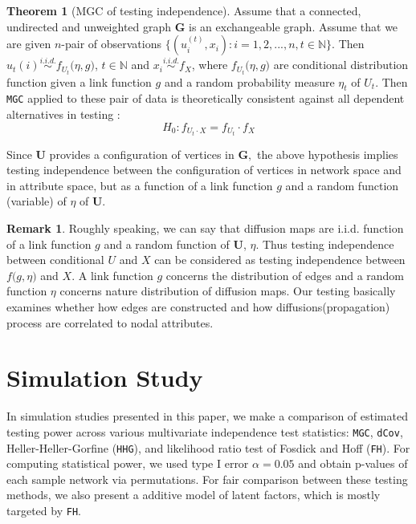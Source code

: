 \documentclass[12pt]{article}
\theoremstyle{definition}
\newtheorem{theorem}{Theorem}[section]
\newtheorem{remark}{Remark}
\begin{document}
\begin{theorem}[MGC of testing independence]
	\label{theorem1}
Assume that a connected, undirected and unweighted graph $\mathbf{G}$ is an exchangeable graph.  Assume that we are given $n$-pair of observations $\{ (u^{(t)}_{i}, x_{i}): i = 1,2,... , n  , t \in \mathbb{N} \}$. Then $u_{t}(i) \overset{i.i.d.}{\sim} f_{U_t} \big(  \eta, g \big)$, $t \in \mathbb{N}$ and $x_{i} \overset{i.i.d.}{\sim} f_{X}$, where $f_{U_t} \big( \eta, g \big)$ are conditional distribution function given a link function $g$ and a random probability measure $\eta_{t}$ of $U_t$. Then \texttt{MGC} applied to these pair of data is theoretically consistent against all dependent alternatives in testing :
$$H_{0} : f_{U_t \cdot X} = f_{U_t} \cdot f_{X}$$
\end{theorem}


Since $\boldsymbol{U}$ provides a configuration of vertices in $\boldsymbol{G},$ the above hypothesis implies testing independence between the configuration of vertices in network space and in attribute space, but as a function of a link function $g$ and a random function (variable) of $\eta$ of $\mathbf{U}$.


\begin{remark}
Roughly speaking, we can say that diffusion maps are i.i.d. function of a link function $g$ and a random function of $\mathbf{U}$, $\eta$. Thus testing independence between conditional $U$ and $X$ can be considered as testing independence between $f \big( g, \eta \big)$ and $X$. A link function $g$ concerns the distribution of edges and a random function $\eta$ concerns nature distribution of diffusion maps. Our testing basically examines whether how edges are constructed and how diffusions(propagation) process are correlated to nodal attributes.  
\end{remark}

\newpage
\section{Simulation Study}

In simulation studies presented in this paper, we make a comparison of estimated testing power across various multivariate independence test statistics: \texttt{MGC}, \texttt{dCov}, Heller-Heller-Gorfine (\texttt{HHG})\cite{HHG}, and likelihood ratio test of Fosdick and Hoff (\texttt{FH}). For computing statistical power, we used type I error $\alpha = 0.05$ and obtain p-values of each sample network via permutations. For fair comparison between these testing methods, we also present a additive model of latent factors, which is mostly targeted by \texttt{FH}.   
\end{document}

